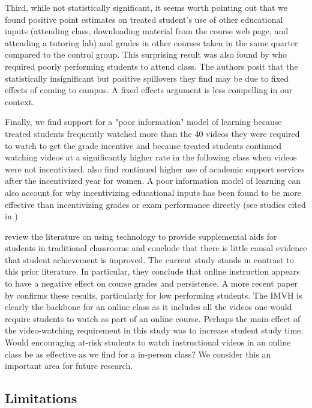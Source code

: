 \documentclass[12pt]{article}
\begin{document}
Third, while not statistically significant, it seems worth pointing out that we found positive point estimates on treated student's use of other educational inputs (attending class, downloading material from the course web page, and attending a tutoring lab) and grades in other courses taken in the same quarter compared to the control group. This surprising result was also found by \textcite{dgm2010} who required poorly performing students to attend class. The authors posit that the statistically insignificant but positive spillovers they find may be due to fixed effects of coming to campus. A fixed effects argument is less compelling in our context.

Finally, we find support for a "poor information" model of learning because treated students frequently watched more than the 40 videos they were required to watch to get the grade incentive and because treated students continued watching videos at a significantly higher rate in the following class when videos were not incentivized. \textcite{alo2009} also find continued higher use of academic support services after the incentivized year for women. A poor information model of learning can also account for why incentivizing educational inputs has been found to be more effective than incentivizing grades or exam performance directly (see studies cited in \textcite{gmr2011})

\textcite{aws2015} review the literature on using technology to provide supplemental aids for students in traditional classrooms and conclude that there is little causal evidence that student achievement is improved. The current study stands in contrast to this prior literature. In particular, they conclude that online instruction appears to have a negative effect on course grades and persistence. A more recent paper by \textcite{bflt2017} confirms these results, particularly for low performing students. The IMVH is clearly the backbone for an online class as it includes all the videos one would require students to watch as part of an online course. Perhaps the main effect of the video-watching requirement in this study was to increase student study time. Would encouraging at-risk students to watch instructional videos in an online class be as effective as we find for a in-person class? We consider this an important area for future research.


\subsection{Limitations}
\end{document}
